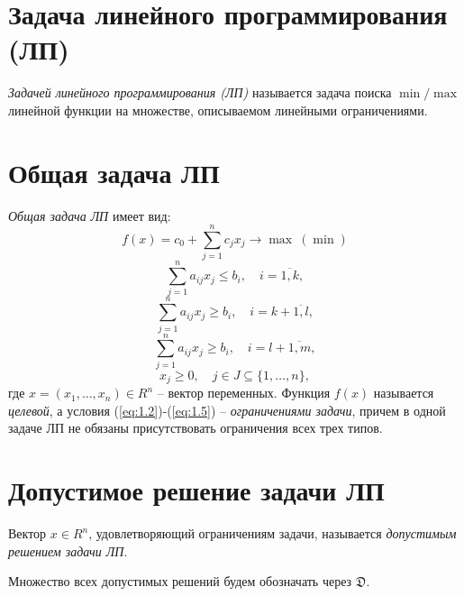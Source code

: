 \section{Задача линейного программирования (ЛП)}

\begin{definition}
	\emph{Задачей линейного программирования (ЛП)} называется задача поиска $\min/\max$ линейной функции на множестве, описываемом линейными ограничениями.
\end{definition}

\section{Общая задача ЛП}

\begin{definition}
	\emph{Общая задача ЛП} имеет вид:
	\begin{equation}\label{eq:1.1}
		f(x)=c_{0}+\sum_{j=1}^{n}c_jx_j \rightarrow \max \ (\min)
	\end{equation}
	\begin{equation}\label{eq:1.2}
		\sum_{j=1}^{n}a_{ij}x_{j} \leqslant b_{i}, \quad i = \overline{1,k},
	\end{equation}
	\begin{equation}\label{eq:1.3}
		\sum_{j=1}^{n}a_{ij}x_{j} \geqslant b_{i}, \quad i = k + \overline{1,l},
	\end{equation}
	\begin{equation}\label{eq:1.4}
		\sum_{j=1}^{n}a_{ij}x_{j} \geqslant b_{i}, \quad i = l + \overline{1,m},
	\end{equation}
	\begin{equation}\label{eq:1.5}
		x_{j} \geqslant 0, \quad j \in J \subseteq \{1,\ldots,n\},
	\end{equation}
	где $x = (x_1,\ldots,x_n)\in R^n$ -- вектор переменных. Функция $f(x)$ называется \emph{целевой}, а условия (\ref{eq:1.2})-(\ref{eq:1.5}) -- \emph{ограничениями задачи}, причем в одной задаче ЛП не обязаны присутствовать ограничения всех трех типов.
\end{definition}

\section{Допустимое решение задачи ЛП}

\begin{definition}
	Вектор $x \in R^{n}$, удовлетворяющий ограничениям задачи, называется \emph{допустимым решением задачи ЛП}.

	Множество всех допустимых решений будем обозначать через $\mathfrak{D}$.
\end{definition}

